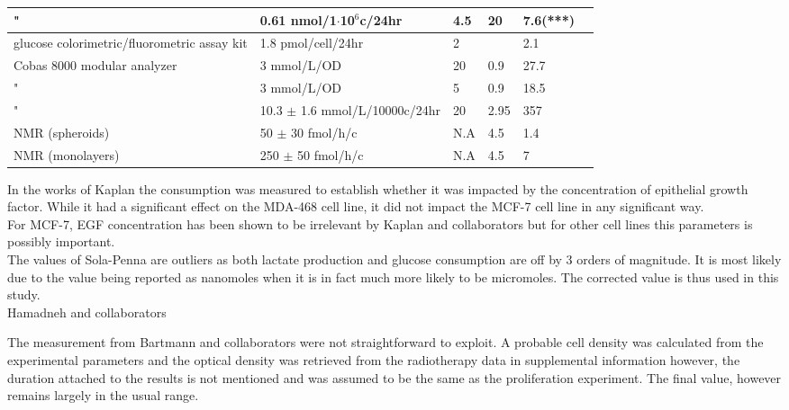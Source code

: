 \documentclass[11pt,a4paper]{article}
\begin{document}
\begin{table}[h!]
\begin{center}
\begin{tabular}{ |p{45mm}|p{35mm}|p{15mm}|p{10mm}|p{15mm}|p{7mm}| }
 \hline
           " & 0.61 nmol/1$\cdot$10$^{6}$c/24hr & 4.5 & 20 & 7.6(***)  & \cite{SolaPenna2019}\\
 \hline
        glucose colorimetric/fluorometric assay kit  & 1.8 pmol/cell/24hr & 2 &  & 2.1  & \cite{Russell2022}\\
 \hline
         Cobas 8000 modular analyzer  & 3 mmol/L/OD & 20  & 0.9 & 27.7 & \cite{Bartmann2018}\\
 \hline
  "  & 3 mmol/L/OD & 5  & 0.9 & 18.5 & \cite{Bartmann2018}\\
 \hline
         "  & 10.3 $\pm$ 1.6 mmol/L/10000c/24hr & 20  & 2.95 & 357 & \cite{Kamerrer2015}\\
 \hline
           NMR (spheroids)  &  50 $\pm$ 30 fmol/h/c & N.A & 4.5 & 1.4 & \cite{Patra2021}\\
 \hline
            NMR (monolayers)  &  250 $\pm$ 50 fmol/h/c & N.A & 4.5 & 7 & \cite{Patra2021}\\
 \hline
\end{tabular}
\end{center}
\end{table}

In the works of Kaplan the consumption was measured to establish whether it was impacted by the concentration of epithelial growth factor. While it had a significant effect on the MDA-468 cell line, it did not impact the MCF-7 cell line in any significant way.\\

For MCF-7, EGF concentration has been shown to be irrelevant by Kaplan and collaborators but for other cell lines this parameters is possibly important.\\

The values of Sola-Penna  are outliers as both lactate production and glucose consumption are off by 3 orders of magnitude. It is most likely due to the value being reported as nanomoles when it is in fact much more likely to be micromoles. The corrected value is thus used in this study.\\

Hamadneh and collaborators

The measurement from Bartmann and collaborators were not straightforward to exploit. A probable cell density was calculated from the experimental parameters and the optical density was retrieved from the radiotherapy data in supplemental information however, the duration attached to the results is not mentioned and was assumed to be the same as the proliferation experiment. The final value, however remains largely in the usual range.\\
\end{document}
